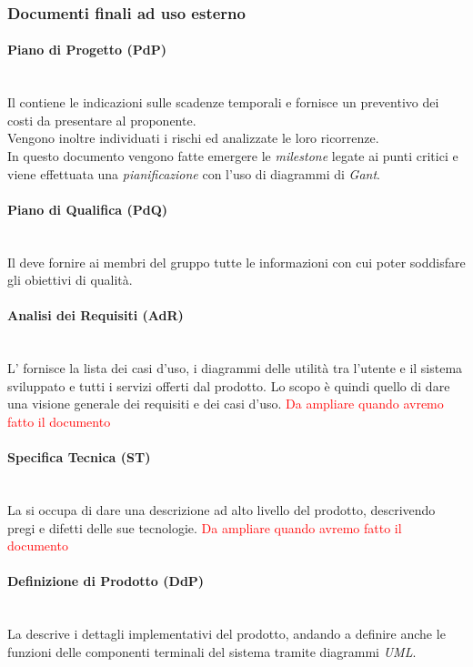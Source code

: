 	\subsubsection{Documenti finali ad uso esterno}
	\paragraph{Piano di Progetto (PdP)}
	~\\Il \PdP{} contiene le indicazioni sulle scadenze temporali e fornisce un preventivo dei costi da presentare al proponente. 
	~\\Vengono inoltre individuati i rischi ed analizzate le loro ricorrenze.
	~\\In questo documento vengono fatte emergere le \emph{milestone} legate ai punti critici e viene effettuata una \emph{pianificazione} con l'uso di diagrammi di \emph{Gant}.
	\paragraph{Piano di Qualifica (PdQ)} 
	~\\Il \PdQ{} deve fornire ai membri del gruppo tutte le informazioni con cui poter soddisfare gli obiettivi di qualità.
	\paragraph{Analisi dei Requisiti (AdR)}
	~\\L'\AdR{} fornisce la lista dei casi d'uso, i diagrammi delle utilità tra l'utente e il sistema sviluppato e tutti i servizi offerti dal prodotto. Lo scopo è quindi quello di dare una visione generale dei requisiti e dei casi d'uso. \textcolor{red}{Da ampliare quando avremo fatto il documento}
	\paragraph{Specifica Tecnica (ST)}
	~\\La \ST{} si occupa di dare una descrizione ad alto livello del prodotto, descrivendo pregi e difetti delle sue tecnologie. \textcolor{red}{Da ampliare quando avremo fatto il documento}
	\paragraph{Definizione di Prodotto (DdP)}
	~\\La \DdP{} descrive i dettagli implementativi del prodotto, andando a definire anche le funzioni delle componenti terminali del sistema tramite diagrammi \emph{UML}.
